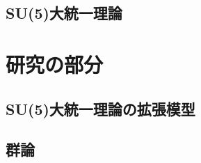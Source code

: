 \documentclass[uplatex,dvipdfmx,a4paper,titlepage]{jsbook}
\theoremstyle{plain}
\theoremstyle{definition}
\begin{document}
\chapter{SU(5)大統一理論}


\part{研究の部分}

\chapter{SU(5)大統一理論の拡張模型}


\appendix
\chapter{群論}




\end{document}
